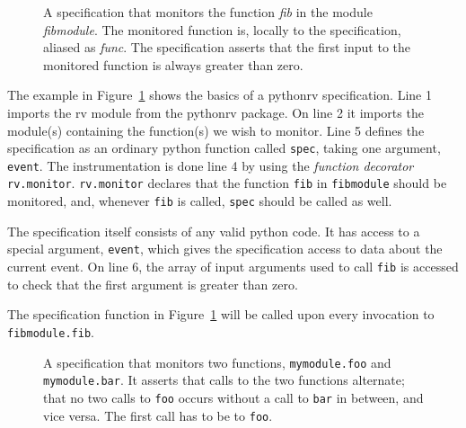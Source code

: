\documentclass[a4paper,11pt]{kth-mag}
\begin{document}
\begin{figure}[h!]

	\begin{center}
	\begin{minipage}{0.7\textwidth}
	
	\end{minipage}
	\end{center}

	\caption{A specification that monitors the function \textit{fib} in the
		module \textit{fibmodule}. The monitored function is, locally to the
		specification, aliased as \textit{func}. The specification asserts that the
		first input to the monitored function is always greater than zero.}
	\label{figure-syntax-example-1}
\end{figure}

The example in Figure~\ref{figure-syntax-example-1} shows the basics of a
pythonrv specification. Line 1 imports the rv module from the pythonrv package.
On line 2 it imports the module(s) containing the function(s) we wish to
monitor. Line 5 defines the specification as an ordinary python function called
\texttt{spec}, taking one argument, \texttt{event}. The instrumentation is done
line 4 by using the \textit{function decorator} \texttt{rv.monitor}.
\texttt{rv.monitor} declares that the function \texttt{fib} in
\texttt{fibmodule} should be monitored, and, whenever \texttt{fib} is called,
\texttt{spec} should be called as well.

The specification itself consists of any valid python code. It has access to a
special argument, \texttt{event}, which gives the specification access to data
about the current event. On line 6, the array of input arguments used to call
\texttt{fib} is accessed to check that the first argument is greater than zero.

The specification function in Figure~\ref{figure-syntax-example-1} will be
called upon every invocation to \texttt{fibmodule.fib}.

\begin{figure}[h!]

	\begin{center}
	\begin{minipage}{0.7\textwidth}
	
	\end{minipage}
	\end{center}

	\caption{A specification that monitors two functions, \texttt{mymodule.foo}
	and \texttt{mymodule.bar}. It asserts that calls to the two functions
alternate; that no two calls to \texttt{foo} occurs without a call to
\texttt{bar} in between, and vice versa. The first call has to be to
\texttt{foo}.}
	\label{figure-syntax-example-2}
\end{figure}
\end{document}
